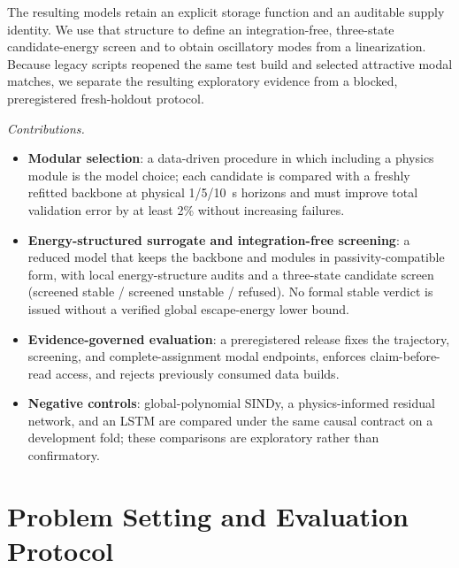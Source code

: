 \documentclass[journal]{IEEEtran}
\begin{document}
The resulting models retain an explicit storage function and an auditable supply
identity. We use that structure to define an integration-free, three-state
candidate-energy screen and to obtain oscillatory modes from a linearization.
Because legacy scripts reopened the same test build and selected attractive
modal matches, we separate the resulting exploratory evidence from a blocked,
preregistered fresh-holdout protocol.

\emph{Contributions.}
\begin{itemize}
\item \textbf{Modular selection}: a data-driven procedure in which including a
      physics module is the model choice; each candidate is compared with a
      freshly refitted backbone at physical 1/5/10~s horizons and must improve
      total validation error by at least 2\% without increasing failures.
\item \textbf{Energy-structured surrogate and integration-free screening}: a
      reduced model that keeps the backbone and modules in passivity-compatible
      form, with local energy-structure audits and a three-state candidate
      screen (screened stable / screened unstable / refused). No formal stable
      verdict is issued without a verified global escape-energy lower bound.
\item \textbf{Evidence-governed evaluation}: a preregistered release fixes the
      trajectory, screening, and complete-assignment modal endpoints, enforces
      claim-before-read access, and rejects previously consumed data builds.
\item \textbf{Negative controls}: global-polynomial SINDy, a physics-informed
      residual network, and an LSTM are compared under the same causal contract
      on a development fold; these comparisons are exploratory rather than
      confirmatory.
\end{itemize}

\section{Problem Setting and Evaluation Protocol}
\label{sec:protocol}
\end{document}
